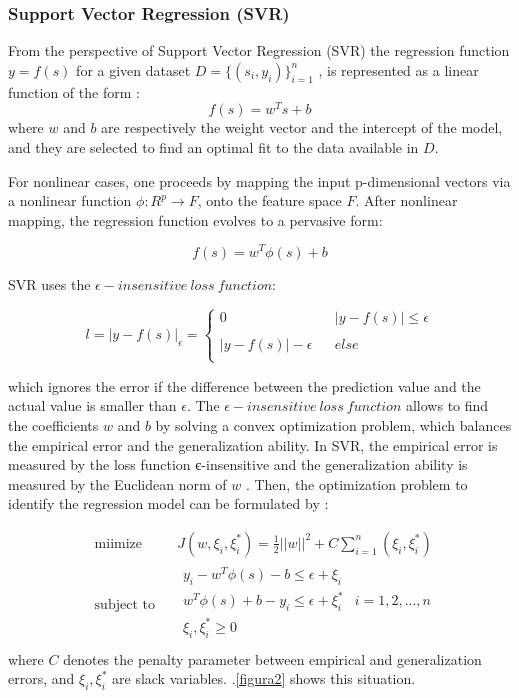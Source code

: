 \documentclass[review]{elsarticle}
\begin{document}
\subsubsection{Support Vector Regression (SVR)}
From the perspective of Support Vector Regression (SVR) the regression function $y = f(s)$ for a given dataset $D=\{(s_i,y_i)\}_{i=1}^n$ , is represented as a linear function of the form \citep{Wei2013}:
$$f(s)=w^Ts+b$$
where $w$ and $b$ are respectively the weight vector and the intercept of the model, and they are selected to find an optimal fit to the data available in $D$.

For nonlinear cases, one proceeds by mapping the input p-dimensional vectors via a nonlinear function $\phi : R^p\rightarrow F$, onto the feature space $F$.  After nonlinear mapping, the regression function evolves to a pervasive form:

$$f(s)=w^T \phi (s)+b$$

SVR uses the $ \epsilon -insensitive \ loss \ function$:

\[l= {\Bigr| y - f(s) \Bigr| }_{\epsilon } = 
\left\{\begin{array}{lcl}
	0 & \mbox{} & {\Bigr| y - f(s) \Bigr| } \leq \epsilon \\
	 &  & \\
	{\Bigr| y - f(s) \Bigr| - \epsilon} & \mbox{} & else\\ \end{array} \right. \] 

which ignores the error if the difference between the prediction value and the actual value is smaller than $\epsilon$.
The $\epsilon -insensitive \ loss \ function$ allows to find the coefficients $w$ and $b$ by solving a convex optimization problem, which balances the empirical error and the generalization ability. In SVR, the empirical error is measured by the loss function є-insensitive and the generalization ability is measured by the Euclidean norm of $w$ \citep{XXXX201X}. Then, the optimization problem to identify the regression model can be formulated by \citep{Wei2013}:

\begin{equation} 
\begin{aligned}
& \underset{}{\text{miimize}}
& & J(w,\xi_i , \xi_i^* ) = \frac{1}{2}   \Bigr| \Bigr| w \Bigr| \Bigr|^2 + C \sum_{i=1}^{n} (\xi_i , \xi_i^* )    \\
& \text{subject to}
& & \begin{array}{lcl} 
y_i - w^T \phi (s) - b  \leq \epsilon + \xi_i   \\
w^T \phi (s) + b - y_i \leq \epsilon + \xi_i^* & i= 1,2,...,n \\
\xi_i , \xi_i^* \geq 0  \\
\end{array}
\end{aligned}
\end{equation}  
where $C$ denotes the penalty parameter between empirical and generalization errors, and  $\xi_i , \xi_i^*$ are slack variables. \figurename
$.$\ref{figura2} shows this situation.
\end{document}
